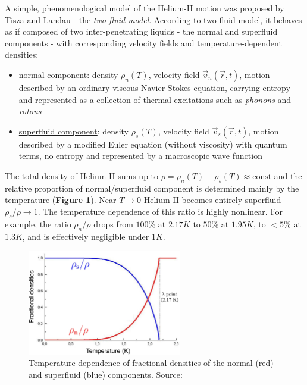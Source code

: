 	A simple, phenomenological model of the Helium-II motion was proposed by Tisza \cite{tisza} and Landau \cite{landau} - the \textit{two-fluid model}. According to two-fluid model, it behaves as if composed of two inter-penetrating liquids - the normal and superfluid components - with corresponding velocity fields and temperature-dependent densities:

	\begin{itemize}
		\item \underline{normal component}: density $\rho_n (T)$, velocity field $\vec{v}_n (\vec{r}, t)$, motion described by an ordinary viscous Navier-Stokes equation, carrying entropy and represented as a collection of thermal excitations such as \textit{phonons} and \textit{rotons}
		\item \underline{superfluid component}: density $\rho_s (T)$, velocity field $\vec{v}_s(\vec{r}, t)$, motion described by a modified Euler equation (without viscosity) with quantum terms, no entropy and represented by a macroscopic wave function
	\end{itemize}

	The total density of Helium-II sums up to $\rho = \rho_n(T) + \rho_s(T) \approx \text{const}$ and the relative proportion of normal/superfluid component is determined mainly by the temperature (\textbf{Figure \ref{densities}}). Near $T \rightarrow 0$ Helium-II becomes entirely superfluid $\rho_s/\rho \rightarrow 1$. The temperature dependence of this ratio is highly nonlinear. For example, the ratio $\rho_n/\rho$ drops from $100\%$ at $2.17\unit{K}$ to $50\%$ at $1.95\unit{K}$, to $<5\%$ at $1.3\unit{K}$, and is effectively negligible under $1\unit{K}$.

	\begin{figure}[h]
		\centering
		\includegraphics[width=0.6\textwidth]{graphics/theory/densities}
		\caption{Temperature dependence of fractional densities of the normal (red) and superfluid (blue) components. Source: \cite{svoc2016}}
		\label{densities}
	\end{figure}

